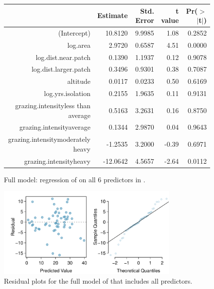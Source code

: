 \begin{figure}[ht]
\centering
\begin{tabular}{rrrrr}
  \hline
 & Estimate & Std. Error & t value & Pr($>$$|$t$|$) \\ 
  \hline
(Intercept) & 10.8120 & 9.9985 & 1.08 & 0.2852 \\ 
  log.area & 2.9720 & 0.6587 & 4.51 & 0.0000 \\ 
  log.dist.near.patch & 0.1390 & 1.1937 & 0.12 & 0.9078 \\ 
  log.dist.larger.patch & 0.3496 & 0.9301 & 0.38 & 0.7087 \\ 
  altitude & 0.0117 & 0.0233 & 0.50 & 0.6169 \\ 
  log.yrs.isolation & 0.2155 & 1.9635 & 0.11 & 0.9131 \\ 
  grazing.intensityless than average & 0.5163 & 3.2631 & 0.16 & 0.8750 \\ 
  grazing.intensityaverage & 0.1344 & 2.9870 & 0.04 & 0.9643 \\ 
  grazing.intensitymoderately heavy & -1.2535 & 3.2000 & -0.39 & 0.6971 \\ 
  grazing.intensityheavy & -12.0642 & 4.5657 & -2.64 & 0.0112 \\ 
   \hline
\end{tabular}
\caption{Full model: regression of  on all 6 predictors in .}
\label{forestbirdsFullModel}
\end{figure}

\begin{figure}[h]
 	\centering
 	\includegraphics[width=0.8\textwidth]
{ch_multiple_linear_regression_oi_biostat/figures/forestbirdsAbunFullModelResidNormPlots/forestbirdsAbunFullModelResidNormPlots.pdf}
     \caption{Residual plots for the full model of  that includes all predictors.}
    	\label{forestbirdsAbunFullModelResidNormPlots}
 \end{figure}

